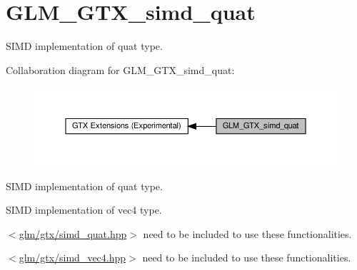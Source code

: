 \hypertarget{group__gtx__simd__vec4}{}\section{G\+L\+M\+\_\+\+G\+T\+X\+\_\+simd\+\_\+quat}
\label{group__gtx__simd__vec4}


S\+I\+MD implementation of quat type.  


Collaboration diagram for G\+L\+M\+\_\+\+G\+T\+X\+\_\+simd\+\_\+quat\+:\nopagebreak
\begin{figure}[H]
\begin{center}
\leavevmode
\includegraphics[width=350pt]{group__gtx__simd__vec4}
\end{center}
\end{figure}
S\+I\+MD implementation of quat type. 

S\+I\+MD implementation of vec4 type.

$<$\hyperlink{simd__quat_8hpp}{glm/gtx/simd\+\_\+quat.\+hpp}$>$ need to be included to use these functionalities.

$<$\hyperlink{simd__vec4_8hpp}{glm/gtx/simd\+\_\+vec4.\+hpp}$>$ need to be included to use these functionalities. 